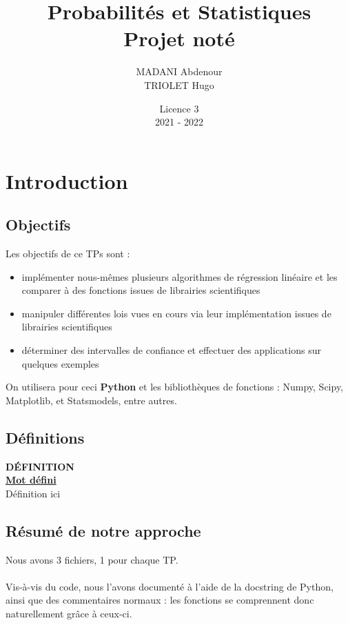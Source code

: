 \documentclass{article}      %
\title{Probabilités et Statistiques\\\Large{Projet noté}}
\author{MADANI Abdenour\\TRIOLET Hugo}
\date{Licence 3\\2021 - 2022}
\begin{document}
\normalsize
\maketitle

\renewcommand*\contentsname{Table des matières}
\tableofcontents
\newpage



\section{Introduction}
\subsection{Objectifs}
Les objectifs de ce TPs sont :
\begin{itemize}
  \item implémenter nous-mêmes plusieurs algorithmes de régression linéaire et les comparer à des fonctions issues de librairies scientifiques
  \item manipuler différentes lois vues en cours via leur implémentation issues de librairies scientifiques
  \item déterminer des intervalles de confiance et effectuer des applications sur quelques exemples
\end{itemize}

On utilisera pour ceci \textbf{Python} et les bibliothèques de fonctions : Numpy, Scipy, Matplotlib, et Statsmodels, entre autres.



\subsection{Définitions}
\begin{definition}
{ \scriptsize \textcolor{definition}{ \textbf{DÉFINITION}}}
\vspace{3px}
\\ \underline{\textbf{Mot défini}}
\vspace{2.5px}
\\ Définition ici
\end{definition}


\subsection{Résumé de notre approche}
Nous avons 3 fichiers, 1 pour chaque TP.
\\%
\\Vis-à-vis du code, nous l’avons documenté à l’aide de la docstring de Python, ainsi que des commentaires normaux : les fonctions se comprennent donc naturellement grâce à ceux-ci.
\end{document}
